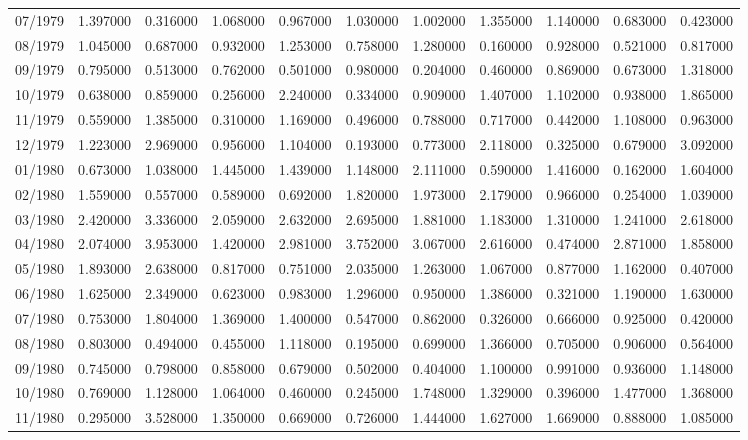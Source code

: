 \begin{tabular}{lrrrrrrrrrr}
07/1979 & 1.397000 & 0.316000 & 1.068000 & 0.967000 & 1.030000 & 1.002000 & 1.355000 & 1.140000 & 0.683000 & 0.423000 \\
08/1979 & 1.045000 & 0.687000 & 0.932000 & 1.253000 & 0.758000 & 1.280000 & 0.160000 & 0.928000 & 0.521000 & 0.817000 \\
09/1979 & 0.795000 & 0.513000 & 0.762000 & 0.501000 & 0.980000 & 0.204000 & 0.460000 & 0.869000 & 0.673000 & 1.318000 \\
10/1979 & 0.638000 & 0.859000 & 0.256000 & 2.240000 & 0.334000 & 0.909000 & 1.407000 & 1.102000 & 0.938000 & 1.865000 \\
11/1979 & 0.559000 & 1.385000 & 0.310000 & 1.169000 & 0.496000 & 0.788000 & 0.717000 & 0.442000 & 1.108000 & 0.963000 \\
12/1979 & 1.223000 & 2.969000 & 0.956000 & 1.104000 & 0.193000 & 0.773000 & 2.118000 & 0.325000 & 0.679000 & 3.092000 \\
01/1980 & 0.673000 & 1.038000 & 1.445000 & 1.439000 & 1.148000 & 2.111000 & 0.590000 & 1.416000 & 0.162000 & 1.604000 \\
02/1980 & 1.559000 & 0.557000 & 0.589000 & 0.692000 & 1.820000 & 1.973000 & 2.179000 & 0.966000 & 0.254000 & 1.039000 \\
03/1980 & 2.420000 & 3.336000 & 2.059000 & 2.632000 & 2.695000 & 1.881000 & 1.183000 & 1.310000 & 1.241000 & 2.618000 \\
04/1980 & 2.074000 & 3.953000 & 1.420000 & 2.981000 & 3.752000 & 3.067000 & 2.616000 & 0.474000 & 2.871000 & 1.858000 \\
05/1980 & 1.893000 & 2.638000 & 0.817000 & 0.751000 & 2.035000 & 1.263000 & 1.067000 & 0.877000 & 1.162000 & 0.407000 \\
06/1980 & 1.625000 & 2.349000 & 0.623000 & 0.983000 & 1.296000 & 0.950000 & 1.386000 & 0.321000 & 1.190000 & 1.630000 \\
07/1980 & 0.753000 & 1.804000 & 1.369000 & 1.400000 & 0.547000 & 0.862000 & 0.326000 & 0.666000 & 0.925000 & 0.420000 \\
08/1980 & 0.803000 & 0.494000 & 0.455000 & 1.118000 & 0.195000 & 0.699000 & 1.366000 & 0.705000 & 0.906000 & 0.564000 \\
09/1980 & 0.745000 & 0.798000 & 0.858000 & 0.679000 & 0.502000 & 0.404000 & 1.100000 & 0.991000 & 0.936000 & 1.148000 \\
10/1980 & 0.769000 & 1.128000 & 1.064000 & 0.460000 & 0.245000 & 1.748000 & 1.329000 & 0.396000 & 1.477000 & 1.368000 \\
11/1980 & 0.295000 & 3.528000 & 1.350000 & 0.669000 & 0.726000 & 1.444000 & 1.627000 & 1.669000 & 0.888000 & 1.085000 \\

\end{tabular}
